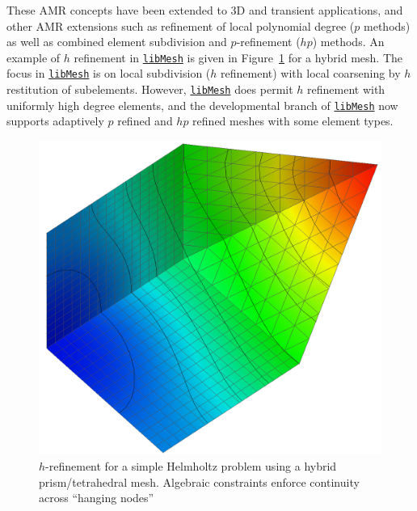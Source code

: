 \documentclass[global,twocolumn,final]{svjour}
\newcommand{\libMesh}{\href{http://libmesh.sourceforge.net}{\texttt{lib\-Mesh}}}
\begin{document}
These AMR concepts have been extended to 3D and transient
applications, and other AMR extensions such as refinement
of local polynomial degree ($p$ methods) as well as combined element
subdivision and $p$-refine\-ment ($hp$) methods.  
An example of $h$ refinement in \libMesh{} is given in
Figure~\ref{fig:amr_helmholtz} for a hybrid mesh.  The focus in
\libMesh{} is on local subdivision ($h$ refinement) with local
coarsening by $h$ restitution of subelements.  However, \libMesh{}
does permit $h$ refinement with uniformly high degree elements, and
the developmental branch of \libMesh{} now supports adaptively $p$
refined and $hp$ refined meshes with some element types.
\begin{figure}
  \begin{center}
    \includegraphics[width=.75\columnwidth]{figures/complicated_constrained}
    \caption{$h$-refinement for a simple Helmholtz problem using a
    hybrid prism/tetrahedral mesh.  Algebraic constraints enforce
    continuity across ``hanging nodes''\label{fig:amr_helmholtz}}
  \end{center}
\end{figure}
  
\end{document}
